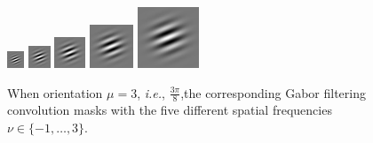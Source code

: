 \begin{figure}[ht]
\begin{center}
\includegraphics[scale=1.0]{ch4/figures/real-1.jpg}
\includegraphics[scale=1.0]{ch4/figures/real0.jpg}
\includegraphics[scale=1.0]{ch4/figures/real1.jpg}
\includegraphics[scale=1.0]{ch4/figures/real2.jpg}
\includegraphics[scale=1.0]{ch4/figures/real3.jpg}\\
\caption{When orientation $\mu = 3$, \textit{i.e.}, $\frac{3\pi}{8}$,the corresponding Gabor filtering convolution masks with the five different spatial frequencies $\nu\in\{-1,\ldots,3\}$.} 
\label{fig:fivemasks}
\end{center}
\end{figure} 

